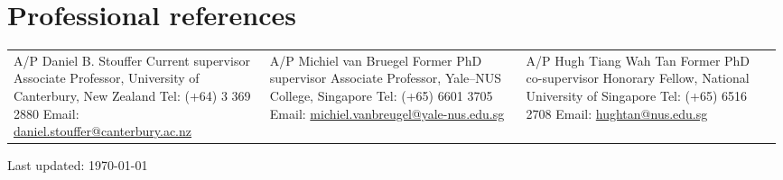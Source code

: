 \documentclass[a4paper]{article}
\def\footerlink{}
\begin{document}
\section*{Professional references}
\begin{tabular}{p{0.33\linewidth} p{0.33\linewidth} p{0.33\linewidth}}
A/P Daniel B. Stouffer \newline Current supervisor \newline Associate Professor, University of Canterbury, New Zealand \newline Tel: (+64) 3 369 2880 \newline Email: \url{daniel.stouffer@canterbury.ac.nz} &
A/P Michiel van Bruegel \newline Former PhD supervisor \newline Associate Professor, Yale--NUS College, Singapore \newline Tel: (+65) 6601 3705 \newline Email: \url{michiel.vanbreugel@yale-nus.edu.sg} &
A/P Hugh Tiang Wah Tan \newline Former PhD co-supervisor \newline Honorary Fellow, National University of Singapore \newline Tel: (+65) 6516 2708 \newline Email: \url{hughtan@nus.edu.sg} 
\end{tabular}

\vfill

\begin{center}
  \begin{footnotesize}
    Last updated: \today \\
    \href{\footerlink}{\texttt{\footerlink}}
  \end{footnotesize}
\end{center}
\end{document}
